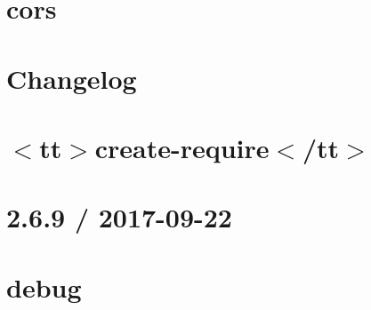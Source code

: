 \documentclass[twoside]{book}
\newcommand{\+}{\discretionary{\mbox{\scriptsize$\hookleftarrow$}}{}{}}
\begin{document}
\chapter{cors}
\label{md__c___users_vaishnavi_jadhav__desktop__developer_code_mean_stack_example_server_node_modules_cors__r_e_a_d_m_e}

\chapter{Changelog}
\label{md__c___users_vaishnavi_jadhav__desktop__developer_code_mean_stack_example_server_node_modules_c07f3b104f4911a2b3988c9fd05a0bdb2}

\chapter{\texorpdfstring{$<$}{<}tt\texorpdfstring{$>$}{>}create-\/require\texorpdfstring{$<$}{<}/tt\texorpdfstring{$>$}{>}}
\label{md__c___users_vaishnavi_jadhav__desktop__developer_code_mean_stack_example_server_node_modules_create_require__r_e_a_d_m_e}

\chapter{2.6.9 / 2017-\/09-\/22}
\label{md__c___users_vaishnavi_jadhav__desktop__developer_code_mean_stack_example_server_node_modules_debug__c_h_a_n_g_e_l_o_g}

\chapter{debug}
\label{md__c___users_vaishnavi_jadhav__desktop__developer_code_mean_stack_example_server_node_modules_debug__r_e_a_d_m_e}

\end{document}
